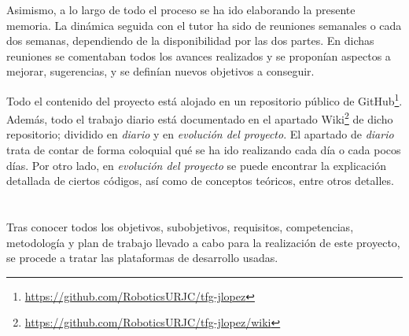 Asimismo, a lo largo de todo el proceso se ha ido elaborando la presente memoria. La dinámica seguida con el tutor ha sido de reuniones semanales o cada dos semanas, dependiendo de la disponibilidad por las dos partes. En dichas reuniones se comentaban todos los avances realizados y se proponían aspectos a mejorar, sugerencias, y se definían nuevos objetivos a conseguir. 

Todo el contenido del proyecto está alojado en un repositorio público de GitHub\footnote{\url{https://github.com/RoboticsURJC/tfg-jlopez}}. Además, todo el trabajo diario está documentado en el apartado Wiki\footnote{\url{https://github.com/RoboticsURJC/tfg-jlopez/wiki}} de dicho repositorio; dividido en \textit{diario} y en \textit{evolución del proyecto}. El apartado de \textit{diario} trata de contar de forma coloquial qué se ha ido realizando cada día o cada pocos días. Por otro lado, en \textit{evolución del proyecto} se puede encontrar la explicación detallada de ciertos códigos, así como de conceptos teóricos, entre otros detalles.\\\\\\ %

Tras conocer todos los objetivos, subobjetivos, requisitos, competencias, metodología y plan de trabajo llevado a cabo para la realización de este proyecto, se procede a tratar las plataformas de desarrollo usadas. 



